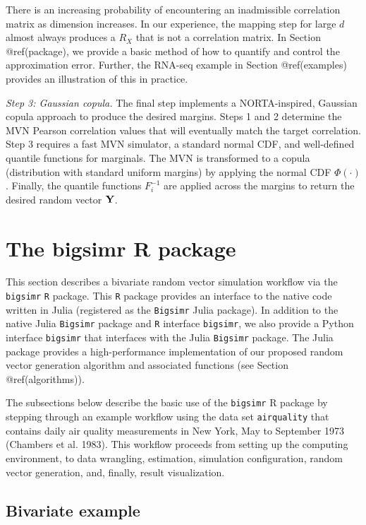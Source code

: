 \documentclass{article}
\begin{document}
There is an increasing probability of encountering an inadmissible
correlation matrix as dimension increases. In our experience, the
mapping step for large \(d\) almost always produces a \(R_X\) that is
not a correlation matrix. In Section @ref(package), we provide a basic
method of how to quantify and control the approximation error. Further,
the RNA-seq example in Section @ref(examples) provides an illustration
of this in practice.

\emph{Step 3: Gaussian copula.} The final step implements a
NORTA-inspired, Gaussian copula approach to produce the desired margins.
Steps 1 and 2 determine the MVN Pearson correlation values that will
eventually match the target correlation. Step 3 requires a fast MVN
simulator, a standard normal CDF, and well-defined quantile functions
for marginals. The MVN is transformed to a copula (distribution with
standard uniform margins) by applying the normal CDF \(\Phi(\cdot)\).
Finally, the quantile functions \(F_i^{-1}\) are applied across the
margins to return the desired random vector \({\bf Y}\).

\hypertarget{the-bigsimr-r-package}{%
\section{The bigsimr R package}\label{the-bigsimr-r-package}}

This section describes a bivariate random vector simulation workflow via
the \texttt{bigsimr} \texttt{R} package. This \texttt{R} package
provides an interface to the native code written in Julia (registered as
the \texttt{Bigsimr} Julia package). In addition to the native Julia
\texttt{Bigsimr} package and \texttt{R} interface \texttt{bigsimr}, we
also provide a Python interface \texttt{bigsimr} that interfaces with
the Julia \texttt{Bigsimr} package. The Julia package provides a
high-performance implementation of our proposed random vector generation
algorithm and associated functions (see Section @ref(algorithms)).

The subsections below describe the basic use of the \texttt{bigsimr} R
package by stepping through an example workflow using the data set
\texttt{airquality} that contains daily air quality measurements in New
York, May to September 1973 (Chambers et al. 1983). This workflow
proceeds from setting up the computing environment, to data wrangling,
estimation, simulation configuration, random vector generation, and,
finally, result visualization.

\hypertarget{bivariate-example}{%
\subsection{Bivariate example}\label{bivariate-example}}
\end{document}
